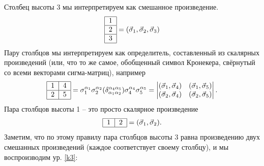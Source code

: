 \documentclass[]{article}
\renewcommand{\[}{\begin{equation}}
\renewcommand{\]}{\end{equation}}
\begin{document}
Столбец высоты 3 мы интерпретируем как смешанное произведение.
$$
\begin{tabular}{ | l | }
\hline
1 \\ \hline
2 \\ \hline
3 \\
\hline
\end{tabular} = (\vec \sigma_1, \vec \sigma_2, \vec \sigma_3)
$$
Пару столбцов мы интерпретируем как определитель, составленный из скалярных произведений (или, что то же самое, обобщенный символ Кронекера\cite{kronecker_wiki}, свёрнутый со всеми векторами сигма-матриц), например
$$
\begin{tabular}{ |l|l| }
\hline
1 & 4 \\ \hline
2 & 5\\
\hline
\end{tabular}
 =
 \sigma_1^{\alpha_1} \sigma_2^{\alpha_2}
 (\delta_{\alpha_1\alpha_2}^{\alpha_4\alpha_5})
 \sigma_4^{\alpha_4} \sigma_5^{\alpha_5}
 =
\begin{vmatrix}
(\vec\sigma_1,\vec\sigma_4) & (\vec\sigma_1,\vec\sigma_5)\\
(\vec\sigma_2,\vec\sigma_4) & (\vec\sigma_2,\vec\sigma_5)\\
\end{vmatrix}.
$$
Пара столбцов высоты 1 -- это просто скалярное произведение
$$
\begin{tabular}{ |l|l| }
\hline
1 & 2 \\
\hline
\end{tabular}
= (\vec \sigma_1, \vec \sigma_2).
$$
Заметим, что по этому правилу пара столбцов высоты 3 равна произведению двух смешанных произведений (каждое соответствует  своему столбцу), и мы воспроизводим ур. \eqref{k3}:
\end{document}
